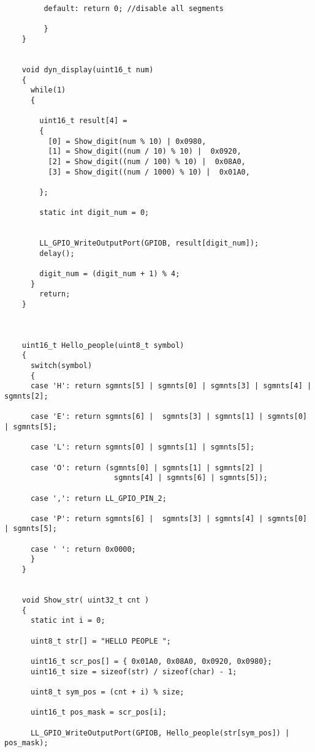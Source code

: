 \begin{verbatim}
         default: return 0; //disable all segments 
              
         }
    }
    
    
    void dyn_display(uint16_t num)
    {
      while(1)
      {
      
        uint16_t result[4] = 
        {
          [0] = Show_digit(num % 10) | 0x0980,                         
          [1] = Show_digit((num / 10) % 10) |  0x0920,         
          [2] = Show_digit((num / 100) % 10) |  0x08A0,     
          [3] = Show_digit((num / 1000) % 10) |  0x01A0,        
      
        };
        
        static int digit_num = 0;
       
     
        LL_GPIO_WriteOutputPort(GPIOB, result[digit_num]); 
        delay();
        
        digit_num = (digit_num + 1) % 4;
      }
        return;
    }
    
    
    
    uint16_t Hello_people(uint8_t symbol)
    {
      switch(symbol)
      {
      case 'H': return sgmnts[5] | sgmnts[0] | sgmnts[3] | sgmnts[4] | sgmnts[2];
      
      case 'E': return sgmnts[6] |  sgmnts[3] | sgmnts[1] | sgmnts[0] | sgmnts[5];
      
      case 'L': return sgmnts[0] | sgmnts[1] | sgmnts[5];
      
      case 'O': return (sgmnts[0] | sgmnts[1] | sgmnts[2] |
                         sgmnts[4] | sgmnts[6] | sgmnts[5]);
                
      case ',': return LL_GPIO_PIN_2; 
      
      case 'P': return sgmnts[6] |  sgmnts[3] | sgmnts[4] | sgmnts[0] | sgmnts[5];
      
      case ' ': return 0x0000;
      }
    }
    
    
    void Show_str( uint32_t cnt )
    {
      static int i = 0;
    
      uint8_t str[] = "HELLO PEOPLE ";
      
      uint16_t scr_pos[] = { 0x01A0, 0x08A0, 0x0920, 0x0980};
      uint16_t size = sizeof(str) / sizeof(char) - 1;
    
      uint8_t sym_pos = (cnt + i) % size;
     
      uint16_t pos_mask = scr_pos[i];
    
      LL_GPIO_WriteOutputPort(GPIOB, Hello_people(str[sym_pos]) | pos_mask);
      

\end{verbatim}
